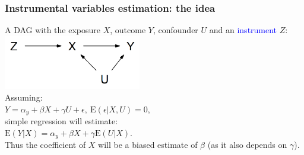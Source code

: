 \documentclass[10pt,dvipsnames,t,handout%
,aspectratio=169%
]{beamer}%
\newcommand{\E}{\mathrm{E}}
\begin{document}
\begin{frame}
 \frametitle{Instrumental variables estimation: the idea}
A DAG with the exposure $X$, outcome $Y$, confounder $U$ and an \textcolor{blue}{instrument} $Z$:\\[0.2cm]
\includegraphics[width=6cm]{IV} \\[0.2cm]
Assuming: \\
$Y= \alpha_y + \beta X + \gamma U +\epsilon,  \  \E(\epsilon|X,U)=0$, \\[0.2cm]
simple regression will estimate: \\[0.2cm]
$\E(Y|X)= \alpha_y + \beta X + \gamma \E(U|X)$. \\[0.3cm]
\alert{Thus the coefficient of $X$ will be a biased estimate of $\beta$ (as it also depends on $\gamma$). }
\end{frame}
\end{document}
